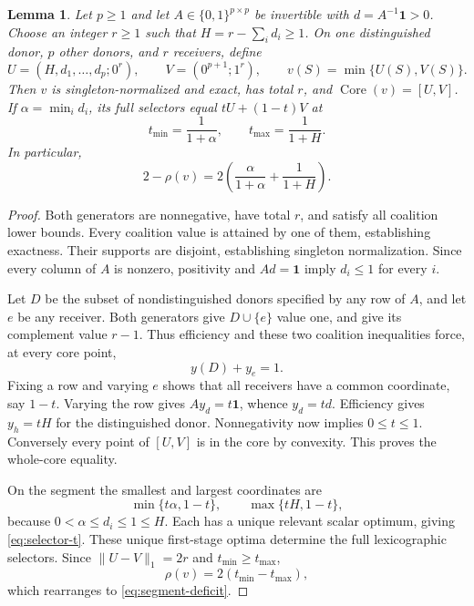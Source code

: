 \documentclass[11pt]{article}
\newtheorem{lemma}[theorem]{Lemma}
\newcommand{\Core}{\operatorname{Core}}
\newcommand{\one}{\mathbf1}
\begin{document}
\begin{lemma}\label{lem:segment}
Let $p\ge1$ and let $A\in\{0,1\}^{p\times p}$ be invertible with
$d=A^{-1}\one>0$. Choose an integer $r\ge1$ such that
$H=r-\sum_i d_i\ge1$. On one distinguished donor, $p$ other donors, and
$r$ receivers, define
\[
 U=(H,d_1,\ldots,d_p;0^r),\qquad
 V=(0^{p+1};1^r),\qquad
 v(S)=\min\{U(S),V(S)\}.
\]
Then $v$ is singleton-normalized and exact, has total $r$, and
$\Core(v)=[U,V]$. If $\alpha=\min_i d_i$, its full selectors equal
$tU+(1-t)V$ at
\begin{equation}\label{eq:selector-t}
 t_{\min}=\frac1{1+\alpha},\qquad
 t_{\max}=\frac1{1+H}.
\end{equation}
In particular,
\begin{equation}\label{eq:segment-deficit}
 2-\rho(v)=2\left(\frac\alpha{1+\alpha}+\frac1{1+H}\right).
\end{equation}
\end{lemma}

\begin{proof}
Both generators are nonnegative, have total $r$, and satisfy all coalition
lower bounds. Every coalition value is attained by one of them, establishing
exactness. Their supports are disjoint, establishing singleton normalization.
Since every column of $A$ is nonzero, positivity and $Ad=\one$ imply
$d_i\le1$ for every $i$.

Let $D$ be the subset of nondistinguished donors specified by any row of
$A$, and let $e$ be any receiver. Both generators give $D\cup\{e\}$
value one, and give its complement value $r-1$. Thus efficiency and these
two coalition inequalities force, at every core point,
\[
 y(D)+y_e=1.
\]
Fixing a row and varying $e$ shows that all receivers have a common
coordinate, say $1-t$. Varying the row gives $Ay_d=t\one$, whence
$y_d=td$. Efficiency gives $y_h=tH$ for the distinguished donor.
Nonnegativity now implies $0\le t\le1$. Conversely every point of
$[U,V]$ is in the core by convexity. This proves the whole-core equality.

On the segment the smallest and largest coordinates are
\[
 \min\{t\alpha,1-t\},\qquad \max\{tH,1-t\},
\]
because $0<\alpha\le d_i\le1\le H$. Each has a unique relevant scalar
optimum, giving \eqref{eq:selector-t}. These unique first-stage optima
determine the full lexicographic selectors. Since
$\|U-V\|_1=2r$ and $t_{\min}\ge t_{\max}$,
\[
 \rho(v)=2(t_{\min}-t_{\max}),
\]
which rearranges to \eqref{eq:segment-deficit}.
\end{proof}
\end{document}
